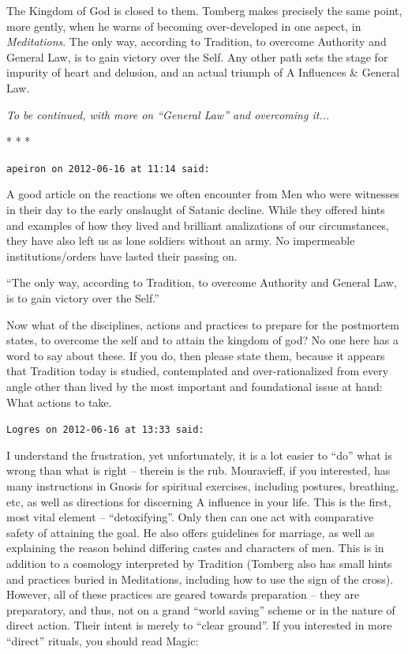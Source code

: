 The Kingdom of God is closed to them. Tomberg makes precisely the same point, more gently, when he warns of becoming over-developed in one aspect, in \emph{Meditations}. The only way, according to Tradition, to overcome Authority and General Law, is to gain victory over the Self. Any other path sets the stage for impurity of heart and delusion, and an actual triumph of A Influences \& General Law.

\emph{To be continued, with more on ``General Law'' and overcoming it... }



\begin{center}* * *\end{center}

\begin{footnotesize}
\begin{sffamily}
\texttt{apeiron on 2012-06-16 at 11:14 said:}

A good article on the reactions we often encounter from Men who were witnesses in their day to the early onslaught of Satanic decline. While they offered hints and examples of how they lived and brilliant analizations of our circumstances, they have also left us as lone soldiers without an army. No impermeable institutions/orders have lasted their passing on.

``The only way, according to Tradition, to overcome Authority and General Law, is to gain victory over the Self.''

Now what of the disciplines, actions and practices to prepare for the postmortem states, to overcome the self and to attain the kingdom of god? No one here has a word to say about these. If you do, then please state them, because it appears that Tradition today is studied, contemplated and over-rationalized from every angle other than lived by the most important and foundational issue at hand: What actions to take.

\hfill

\texttt{Logres on 2012-06-16 at 13:33 said:}

I understand the frustration, yet unfortunately, it is a lot easier to ``do'' what is wrong than what is right -- therein is the rub. Mouravieff, if you interested, has many instructions in Gnosis for spiritual exercises, including postures, breathing, etc, as well as directions for discerning A influence in your life. This is the first, most vital element -- ``detoxifying''. Only then can one act with comparative safety of attaining the goal. He also offers guidelines for marriage, as well as explaining the reason behind differing castes and characters of men. This is in addition to a cosmology interpreted by Tradition (Tomberg also has small hints and practices buried in Meditations, including how to use the sign of the cross). However, all of these practices are geared towards preparation -- they are preparatory, and thus, not on a grand ``world saving'' scheme or in the nature of direct action. Their intent is merely to ``clear ground''. If you interested in more ``direct'' rituals, you should read Magic:


\end{sffamily}
\end{footnotesize}
